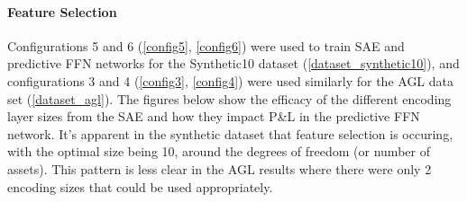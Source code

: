\documentclass[a4paper,latin]{paper}
\begin{document}
\paragraph{Feature Selection}
Configurations 5 and 6 (\ref{config5}, \ref{config6}) were used to train SAE and predictive FFN networks for the Synthetic10 dataset (\ref{dataset_synthetic10}), and configurations 3 and 4 (\ref{config3}, \ref{config4}) were used similarly for the AGL data set (\ref{dataset_agl}). The figures below show the efficacy of the different encoding layer sizes from the SAE and how they impact P\&L in the predictive FFN network. It's apparent in the synthetic dataset that feature selection is occuring, with the optimal size being 10, around the degrees of freedom (or number of assets). This pattern is less clear in the AGL results where there were only 2 encoding sizes that could be used appropriately.
\end{document}
